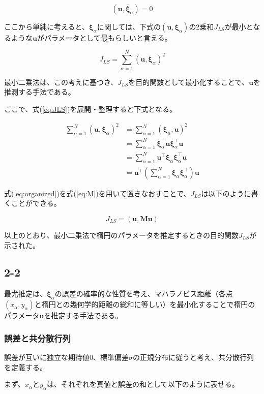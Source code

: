 \documentclass[12pt,a4j]{jsarticle}
\newcommand{\xa}{x_\alpha}
\newcommand{\ya}{y_\alpha}
\newcommand{\xia}{\bm{\xi}_\alpha}
\newcommand{\bxia}{\bar{\bm{\xi}}_\alpha}
\begin{document}
  \begin{equation}
    (\bm{u}, \bxia) = 0 \label{eq:uxia0}
  \end{equation}

  ここから単純に考えると、$\xia$に関しては、下式の$(\bm{u}, \xia)$の2乗和$J_{LS}$が最小となるような$\bm{u}$がパラメータとして最もらしいと言える。

  \begin{equation}
    J_{LS} = \sum_{\alpha = 1}^N (\bm{u}, \xia)^2 \label{eq:JLS}
  \end{equation}

  最小二乗法は、この考えに基づき、$J_{LS}$を目的関数として最小化することで、$\bm{u}$を推測する手法である。\par
  ここで、式(\ref{eq:JLS})を展開・整理すると下式となる。

  \begin{align}
    \sum_{\alpha = 1}^N (\bm{u}, \xia)^2 &= \sum_{\alpha = 1}^N (\xia, \bm{u})^2 \nonumber \\
     &= \sum_{\alpha = 1}^N \xia^\top \bm{u} \xia^\top \bm{u} \nonumber \\
     &= \sum_{\alpha = 1}^N \bm{u}^\top \xia \xia^\top \bm{u} \nonumber \\
     &= \bm{u}^\top \left(\sum_{\alpha = 1}^N \xia \xia^\top \right) \bm{u} \label{eq:organized}
  \end{align}

  式(\ref{eq:organized})を式(\ref{eq:M})を用いて置きなおすことで、$J_{LS}$は以下のように書くことができる。

  \begin{equation}
    J_{LS} = (\bm{u}, \bm{Mu})
  \end{equation}

  以上のとおり、最小二乗法で楕円のパラメータを推定するときの目的関数$J_{LS}$が示された。

  \subsection*{2-2}
    最尤推定は、$\xia$の誤差の確率的な性質を考え、マハラノビス距離（各点$(\xa, \ya)$と楕円との幾何学的距離の総和に等しい）を最小化することで楕円のパラメータ$\bm{u}$を推定する手法である。
  
    \subsubsection*{誤差と共分散行列}
      誤差が互いに独立な期待値$0$、標準偏差$\sigma$の正規分布に従うと考え、共分散行列を定義する。\par
      まず、$\xa$と$\ya$は、それぞれを真値と誤差の和として以下のように表せる。
\end{document}
